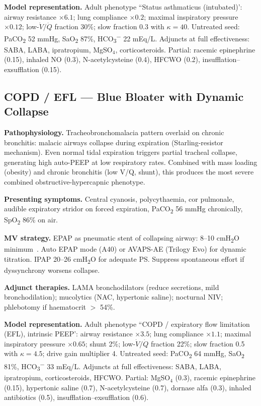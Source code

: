 \textbf{Model representation.} Adult phenotype ``Status asthmaticus (intubated)': airway resistance $\times6.1$; lung compliance $\times0.2$; maximal inspiratory pressure $\times0.12$; low-$\dot V/\dot Q$ fraction 30\%; slow fraction 0.3 with $\kappa=40$. Untreated seed: PaCO\textsubscript{2} 52 mmHg, SaO\textsubscript{2} 87\%, HCO\textsubscript{3}\textsuperscript{$-$} 22 mEq/L. Adjuncts at full effectiveness: SABA, LABA, ipratropium, MgSO$_4$, corticosteroids. Partial: racemic epinephrine (0.15), inhaled NO (0.3), N-acetylcysteine (0.4), HFCWO (0.2), insufflation--exsufflation (0.15).

\subsection{COPD / EFL --- Blue Bloater with Dynamic Collapse}
\textbf{Pathophysiology.} Tracheobronchomalacia pattern overlaid on chronic bronchitis: malacic airways collapse during expiration (Starling-resistor mechanism). Even normal tidal expiration triggers partial tracheal collapse, generating high auto-PEEP at low respiratory rates. Combined with mass loading (obesity) and chronic bronchitis (low V/Q, shunt), this produces the most severe combined obstructive-hypercapnic phenotype.

\textbf{Presenting symptoms.} Central cyanosis, polycythaemia, cor pulmonale, audible expiratory stridor on forced expiration, PaCO\textsubscript{2} 56 mmHg chronically, SpO\textsubscript{2} 86\% on air.

\textbf{MV strategy.} EPAP as pneumatic stent of collapsing airway: 8--10 cmH\textsubscript{2}O minimum~\citep{rossi1995,appendini1994}. Auto EPAP mode (A40) or AVAPS-AE (Trilogy Evo) for dynamic titration. IPAP 20--26 cmH\textsubscript{2}O for adequate PS. Suppress spontaneous effort if dyssynchrony worsens collapse.

\textbf{Adjunct therapies.} LAMA bronchodilators (reduce secretions, mild bronchodilation); mucolytics (NAC, hypertonic saline); nocturnal NIV; phlebotomy if haematocrit $>$ 54\%.

\textbf{Model representation.} Adult phenotype ``COPD / expiratory flow limitation (EFL), intrinsic PEEP': airway resistance $\times3.5$; lung compliance $\times1.1$; maximal inspiratory pressure $\times0.65$; shunt 2\%; low-$\dot V/\dot Q$ fraction 22\%; slow fraction 0.5 with $\kappa=4.5$; drive gain multiplier 4. Untreated seed: PaCO\textsubscript{2} 64 mmHg, SaO\textsubscript{2} 81\%, HCO\textsubscript{3}\textsuperscript{$-$} 33 mEq/L. Adjuncts at full effectiveness: SABA, LABA, ipratropium, corticosteroids, HFCWO. Partial: MgSO$_4$ (0.3), racemic epinephrine (0.15), hypertonic saline (0.7), N-acetylcysteine (0.7), dornase alfa (0.3), inhaled antibiotics (0.5), insufflation--exsufflation (0.6).

